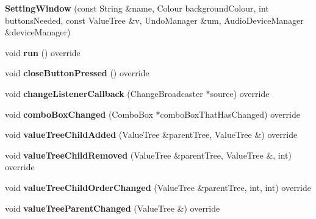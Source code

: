 \begin{DoxyCompactItemize}
\item 
\mbox{\label{class_setting_window_a7eeac4f72de3bdaa66a4edaf1d67c0bb}} 
{\bfseries Setting\+Window} (const String \&name, Colour background\+Colour, int buttons\+Needed, const Value\+Tree \&v, Undo\+Manager \&um, Audio\+Device\+Manager \&device\+Manager)
\item 
\mbox{\label{class_setting_window_a927395dde858c278767b5a03b0098d93}} 
void {\bfseries run} () override
\item 
\mbox{\label{class_setting_window_a9219c106f019c2062124ee3afa0f5c55}} 
void {\bfseries close\+Button\+Pressed} () override
\item 
\mbox{\label{class_setting_window_aec7b180f0788c4f02fcb98ee4dee5de3}} 
void {\bfseries change\+Listener\+Callback} (Change\+Broadcaster $\ast$source) override
\item 
\mbox{\label{class_setting_window_aa99ed532ad10561a488618d9cf5c3bb4}} 
void {\bfseries combo\+Box\+Changed} (Combo\+Box $\ast$combo\+Box\+That\+Has\+Changed) override
\item 
\mbox{\label{class_setting_window_a81f320694972e6e7c79576b83c5d9aab}} 
void {\bfseries value\+Tree\+Child\+Added} (Value\+Tree \&parent\+Tree, Value\+Tree \&) override
\item 
\mbox{\label{class_setting_window_a8497cc40fd6fe26a28bbc52a8362a2da}} 
void {\bfseries value\+Tree\+Child\+Removed} (Value\+Tree \&parent\+Tree, Value\+Tree \&, int) override
\item 
\mbox{\label{class_setting_window_a94bcdfef14ccd7504a104d76a81d21ec}} 
void {\bfseries value\+Tree\+Child\+Order\+Changed} (Value\+Tree \&parent\+Tree, int, int) override
\item 
\mbox{\label{class_setting_window_ab015a28f4121b979103d3729678f1829}} 
void {\bfseries value\+Tree\+Parent\+Changed} (Value\+Tree \&) override
\item 

\end{DoxyCompactItemize}
